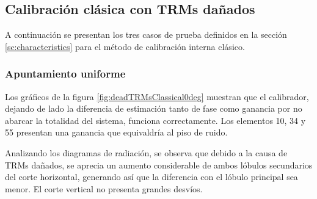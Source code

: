 \subsection{Calibración clásica con TRMs dañados}

A continuación se presentan los tres casos de prueba definidos en la sección \ref{sc:characteristics} para el método de
calibración interna clásico.


\subsubsection{Apuntamiento uniforme}

Los gráficos de la figura \ref{fig:deadTRMsClassical0deg} muestran que el calibrador, dejando de lado la diferencia de 
estimación tanto de fase como ganancia por no abarcar la totalidad del sistema, funciona correctamente. Los elementos 10, 34 y 
55 presentan una ganancia que equivaldría al piso de ruido.

Analizando los diagramas de radiación, se observa que debido a la causa de TRMs dañados, se aprecia un aumento considerable de
ambos lóbulos secundarios del corte horizontal, generando así que la diferencia con el lóbulo principal sea menor. El corte
vertical no presenta grandes desvíos.

